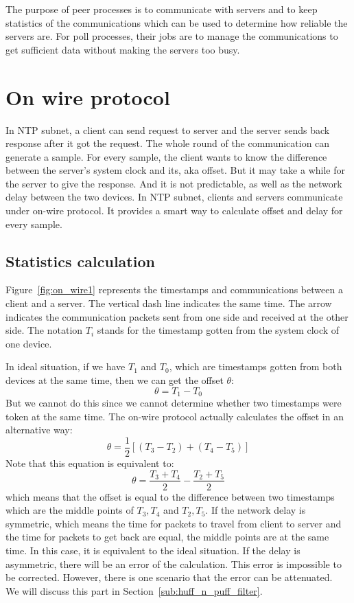 

The purpose of peer processes is to communicate with servers and to keep
statistics of the communications which can be used to determine how reliable
the servers are. For poll processes, their jobs are to manage the
communications to get sufficient data without making the servers too busy.

\section{On wire protocol}%
\label{sec:on_wire_protocol}
In NTP subnet, a client can send request to server and the server sends back
response after it got the request. The whole round of the communication can
generate a sample. For every sample, the client wants to know the difference
between the server's system clock and its, aka offset.
But it may take a while for the server to give the response. And it is not
predictable, as well as the network delay between the two devices.
In NTP subnet, clients and servers communicate under on-wire protocol. It
provides a smart way to calculate offset and delay for every sample. 

\subsection{Statistics calculation}%
\label{sub:statistics_calculation}
Figure~\ref{fig:on_wire1} represents the timestamps and communications between
a client and a server. The vertical dash line indicates the same time. The
arrow indicates the communication packets sent from one side and received at
the other side. The notation $T_i$ stands for the timestamp gotten from the
system clock of one device. 



In ideal situation, if we have $T_1$ and $T_0$, which are timestamps gotten
from both devices at the same time, then we can get the offset $\theta$:
$$\theta = T_1 - T_0$$
But we cannot do this since we cannot determine whether two timestamps were
token at the same time. The on-wire protocol actually calculates the offset in
an alternative way:
\begin{equation}
    \theta = \frac{1}{2}\left[(T_3 - T_2) + (T_4 - T_5)\right]
    \label{eq:offset_def}
\end{equation}
Note that this equation is equivalent to:
$$\theta = \frac{T_3 + T_4}{2} - \frac{T_2 + T_5}{2}$$
which means that the offset is equal to the difference between two timestamps
which are the middle points of $T_3, T_4$ and $T_2, T_5$. 
If the network delay is symmetric, which means the time for packets to travel
from client to server and the time for packets to get back are equal, the
middle points are at the same time. In this case, it is equivalent to the ideal
situation. If the delay is asymmetric, there will be an error of the
calculation. This error is impossible to be corrected. However, there is one
scenario that the error can be attenuated.~\cite{redbook} We will discuss this
part in Section~\ref{sub:huff_n_puff_filter}.

